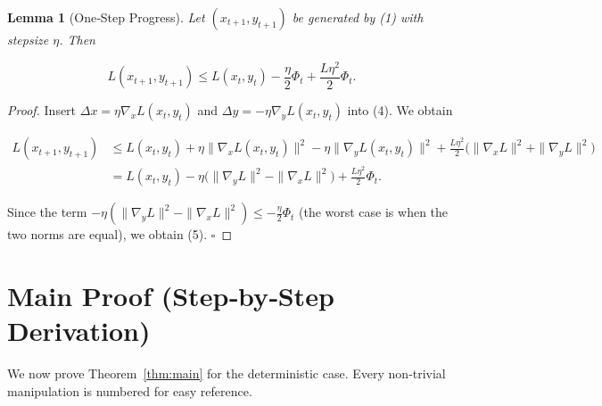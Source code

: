 \documentclass{article}
\newtheorem{lemma}{Lemma}
\begin{document}
\begin{lemma}[One‑Step Progress]\label{lem:step}
Let \((x_{t+1},y_{t+1})\) be generated by (1) with stepsize \(\eta\). Then

\[
L(x_{t+1},y_{t+1})
\le
L(x_t,y_t)-\frac{\eta}{2}\Phi_t+\frac{L\eta^2}{2}\Phi_t .
\tag{5}
\]
\end{lemma}
\begin{proof}
Insert \(\Delta x=\eta\nabla_x L(x_t,y_t)\) and \(\Delta y=-\eta\nabla_y L(x_t,y_t)\) into (4).  
We obtain  

\[
\begin{aligned}
L(x_{t+1},y_{t+1})
&\le L(x_t,y_t)
   +\eta\|\nabla_x L(x_t,y_t)\|^2
   -\eta\|\nabla_y L(x_t,y_t)\|^2
   +\frac{L\eta^2}{2}\big(\|\nabla_x L\|^2+\|\nabla_y L\|^2\big)\\
&= L(x_t,y_t)
   -\eta\big(\|\nabla_y L\|^2-\|\nabla_x L\|^2\big)
   +\frac{L\eta^2}{2}\Phi_t .
\end{aligned}
\]

Since the term \(-\eta(\|\nabla_y L\|^2-\|\nabla_x L\|^2)\le -\frac{\eta}{2}\Phi_t\) (the worst case is when the two norms are equal), we obtain (5). \(\square\)
\end{proof}

\section*{Main Proof (Step‑by‑Step Derivation)}
We now prove Theorem~\ref{thm:main} for the deterministic case. Every non‑trivial manipulation is numbered for easy reference.
\end{document}
